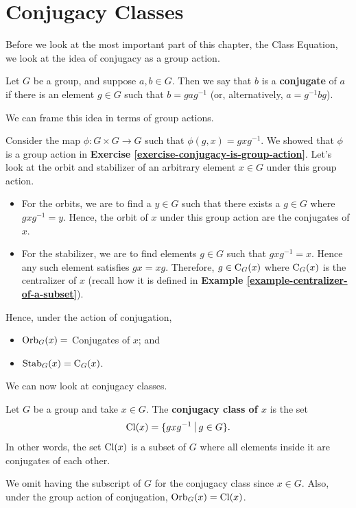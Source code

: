 \newpage

\section{Conjugacy Classes}
Before we look at the most important part of this chapter, the Class Equation, we look at the idea of conjugacy as a group action.
\begin{definition}
    Let $G$ be a group, and suppose $a, b \in G$. Then we say that $b$ is a \textbf{conjugate} of $a$ if there is an element $g \in G$ such that $b = gag^{-1}$ (or, alternatively, $a=g^{-1}bg$).
\end{definition}
We can frame this idea in terms of group actions.

Consider the map $\phi: G\times G\to G$ such that $\phi(g, x) = gxg^{-1}$. We showed that $\phi$ is a group action in \textbf{Exercise \ref{exercise-conjugacy-is-group-action}}. Let's look at the orbit and stabilizer of an arbitrary element $x \in G$ under this group action.
\begin{itemize}
    \item For the orbits, we are to find a $y \in G$ such that there exists a $g \in G$ where $gxg^{-1} = y$. Hence, the orbit of $x$ under this group action are the conjugates of $x$.
    \item For the stabilizer, we are to find elements $g \in G$ such that $gxg^{-1} = x$. Hence any such element satisfies $gx = xg$. Therefore, $g \in \mathrm{C}_{G}(x)$ where $\mathrm{C}_{G}(x)$ is the centralizer of $x$ (recall how it is defined in \textbf{Example \ref{example-centralizer-of-a-subset}}).
\end{itemize}

Hence, under the action of conjugation,
\begin{itemize}
    \item $\mathrm{Orb}_{G}(x) = $ Conjugates of $x$; and
    \item $\mathrm{Stab}_{G}(x) = \mathrm{C}_{G}(x)$.
\end{itemize}

\newpage

We can now look at conjugacy classes.
\begin{definition}
    Let $G$ be a group and take $x \in G$. The \textbf{conjugacy class of $x$} is the set
    \[
        \Cl{x} = \{gxg^{-1} \vert g \in G\}.
    \]
    In other words, the set $\mathrm{Cl}(x)$ is a subset of $G$ where all elements inside it are conjugates of each other.
\end{definition}
\begin{remark}
    We omit having the subscript of $G$ for the conjugacy class since $x \in G$. Also, under the group action of conjugation, $\mathrm{Orb}_{G}(x) = \mathrm{Cl}(x)$.
\end{remark}


